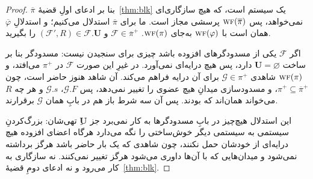 \documentclass[10pt,oneside,openany]{book}
\renewcommand{\emptyset}{\varnothing}
\newcommand{\uses}{\mathbf{U}}
\newcommand{\WF}{\op{wf}}
\newcommand{\F}{\mathcal{F}}
\newcommand{\G}{\mathcal{G}}
\newcommand{\op}[1]{\textnormal{\textsc{#1}}}
\theoremstyle{accentdef}
\theoremstyle{accentplain}
\begin{document}
\begin{proof}
$\overline{\pi}$ بنا بر ادعای اولِ قضیهٔ~\ref{thm:blk} یک سیستم است، که
هیچ سازگاری‌ای نمی‌خواهد، پس $\WF(\overline{\pi})$ پرسشی مجاز است. ما برای
$\overline{\pi}$ استدلال می‌کنیم؛ و استدلالِ $\overline{\varphi}$ همان است
با $\WF(\varphi)$ به‌جای $\WF(\pi)$. $\F \in \overline{\pi}^{+}$ و
$(\F',R) \in \F.\uses$ را بگیرید.

اگر $\F$ یکی از مسدودگرهای افزوده باشد چیزی برای سنجیدن نیست: مسدودگر بنا
بر ساخت $\uses = \emptyset$ دارد، پس هیچ درایه‌ای نمی‌آورد. در غیرِ این
صورت $\F$ در $\pi^{+}$ می‌افتد، و $\WF(\pi)$ شاهدی $\G \in \pi^{+}$ برای آن
درایه فراهم می‌کند. آن شاهد هنوز حاضر است، چون $\pi^{+} \subseteq
\overline{\pi}^{+}$، و مسدودسازی میدانِ هیچ عضوی را تغییر نمی‌دهد، پس
$\G.F$، $\G.s$ و هر چه $R$ می‌خواند همان‌اند که بودند. پس آن سه شرط باز هم
در بابِ همان $\G$ برقرارند.

این استدلال هیچ‌چیز در بابِ مسدودگرها به کار نمی‌برد جز $\uses$ِ تهی‌شان:
بزرگ‌کردنِ سیستمی به سیستمی دیگر خوش‌ساختی را نگه می‌دارد هرگاه اعضای افزوده
هیچ درایه‌ای از خودشان حمل نکنند، چون شاهدی که یک بار حاضر باشد هرگز
برداشته نمی‌شود و میدان‌هایی که با آن‌ها داوری می‌شود هرگز تغییر نمی‌کنند.
نه سازگاری به کار می‌رود و نه ادعای دومِ قضیهٔ~\ref{thm:blk}.
\end{proof}
\end{document}
